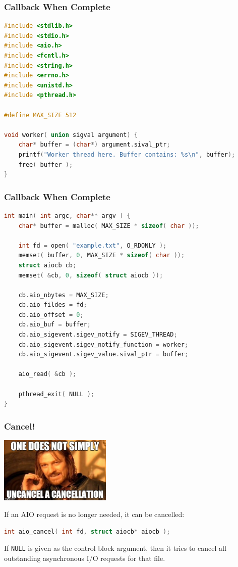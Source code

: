 \begin{frame}[fragile]
\frametitle{Callback When Complete}

\begin{lstlisting}[language=C]
#include <stdlib.h>
#include <stdio.h>
#include <aio.h>
#include <fcntl.h>
#include <string.h>
#include <errno.h>
#include <unistd.h>
#include <pthread.h>

#define MAX_SIZE 512

void worker( union sigval argument) {
    char* buffer = (char*) argument.sival_ptr;
    printf("Worker thread here. Buffer contains: %s\n", buffer);
    free( buffer );
}
\end{lstlisting}

\end{frame}


\begin{frame}[fragile]
\frametitle{Callback When Complete}
\begin{lstlisting}[language=C]
int main( int argc, char** argv ) {
    char* buffer = malloc( MAX_SIZE * sizeof( char ));

    int fd = open( "example.txt", O_RDONLY );
    memset( buffer, 0, MAX_SIZE * sizeof( char ));
    struct aiocb cb;
    memset( &cb, 0, sizeof( struct aiocb ));

    cb.aio_nbytes = MAX_SIZE;
    cb.aio_fildes = fd;
    cb.aio_offset = 0;
    cb.aio_buf = buffer;
    cb.aio_sigevent.sigev_notify = SIGEV_THREAD;
    cb.aio_sigevent.sigev_notify_function = worker;
    cb.aio_sigevent.sigev_value.sival_ptr = buffer;

    aio_read( &cb );
    
    pthread_exit( NULL );
}
\end{lstlisting}

\end{frame}


\begin{frame}[fragile]
\frametitle{Cancel!}

\begin{center}
	\includegraphics[width=0.4\textwidth]{images/cancellation.jpg}
\end{center}
If an AIO request is no longer needed, it can be cancelled:
\begin{lstlisting}[language=C]
int aio_cancel( int fd, struct aiocb* aiocb );
\end{lstlisting}

 If \texttt{NULL} is given as the control block argument, then it tries to cancel all outstanding asynchronous I/O requests for that file.

\end{frame}


